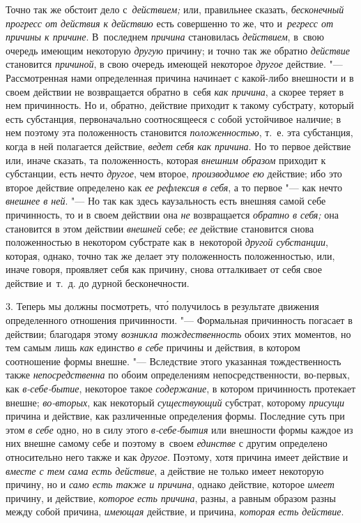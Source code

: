 Точно так же обстоит дело с~{\em действием;} или, правильнее сказать,
{\em бесконечный прогресс от действия к действию} есть совершенно то же, что
и~{\em регресс от причины к причине}. В~последнем {\em причина} становилась
{\em действием}, в~свою очередь имеющим некоторую {\em другую} причину; и точно
так же обратно {\em действие} становится {\em причиной}, в свою очередь имеющей
некоторое {\em другое} действие. "--- Рассмотренная нами определенная причина
начинает с какой-либо внешности и в своем действии не возвращается обратно
в~себя {\em как причина}, а скорее теряет в нем причинность. Но и, обратно,
действие приходит к такому субстрату, который есть субстанция, первоначально
соотносящееся с собой устойчивое наличие; в нем поэтому эта положенность
становится {\em положенностью}, т.~е. эта субстанция, когда в ней полагается
действие, {\em ведет себя как причина}. Но то первое действие или, иначе
сказать, та положенность, которая {\em внешним образом} приходит к субстанции,
есть нечто {\em другое}, чем второе, {\em производимое ею} действие; ибо это
второе действие определено как {\em ее рефлексия} {\em в себя}, а то первое
"--- как нечто {\em внешнее в ней}. "--- Но так как здесь каузальность есть
внешняя самой себе причинность, то и в своем действии она {\em не} возвращается
{\em обратно в себя;} она становится в этом действии {\em внешней} себе;
{\em ее} действие становится снова положенностью в некотором субстрате как
в~некоторой {\em другой субстанции}, которая, однако, точно так же делает эту
положенность положенностью, или, иначе говоря, проявляет себя как причину,
снова отталкивает от себя свое действие и~т.~д. до дурной бесконечности.

3. Теперь мы должны посмотреть, чт\'{о} получилось в результате движения
определенного отношения причинности. "--- Формальная причинность погасает в
действии; благодаря этому {\em возникла тождественность} обоих этих моментов,
но тем самым лишь {\em как} единство {\em в себе} причины и действия, в котором
соотношение формы внешне. "--- Вследствие этого указанная тождественность также
{\em непосредственна} по обоим определениям непосредственности, во-первых, как
{\em в-себе-бытие}, некоторое такое {\em содержание}, в котором причинность
протекает внешне; {\em во-вторых}, как некоторый {\em существующий} субстрат,
которому {\em присущи} причина и действие, как различенные определения формы.
Последние суть при этом {\em в себе} одно, но в силу этого {\em в-себе-бытия}
или внешности формы каждое из них внешне самому себе и поэтому в~своем
{\em единстве} с другим определено относительно него также и как {\em другое}.
Поэтому, хотя причина имеет действие и {\em вместе с тем сама есть действие},
а действие не только имеет некоторую причину, но и
{\em само есть также и причина}, однако действие, которое {\em имеет} причину,
и действие, {\em которое есть причина}, разны, а равным образом разны между
собой причина, {\em имеющая} действие, и причина, {\em которая есть действие}.

